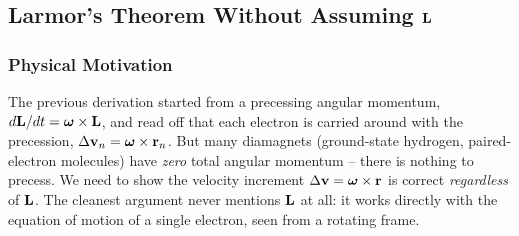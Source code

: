 \subsection{Larmor's Theorem Without Assuming $\mathbf{L}$}\label{subsec:lec19-larmor}

\subsubsection*{Physical Motivation}
The previous derivation started from a precessing angular momentum,
$d\mathbf{L}/dt=\boldsymbol{\omega}\times\mathbf{L}$, and read off that each electron is carried
around with the precession, $\Delta\mathbf{v}_n=\boldsymbol{\omega}\times\mathbf{r}_n$. But many
diamagnets (ground-state hydrogen, paired-electron molecules) have \emph{zero} total
angular momentum -- there is nothing to precess. We need to show the velocity increment
$\Delta\mathbf{v}=\boldsymbol{\omega}\times\mathbf{r}$ is correct \emph{regardless} of $\mathbf{L}$.
The cleanest argument never mentions $\mathbf{L}$ at all: it works directly with the
equation of motion of a single electron, seen from a rotating frame.

